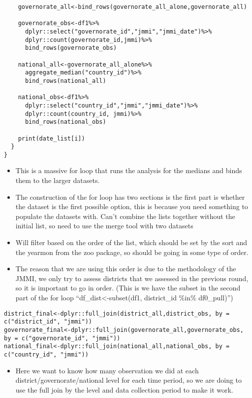 \documentclass[
]{article}
\providecommand{\tightlist}{%
  \setlength{\itemsep}{0pt}\setlength{\parskip}{0pt}}
\begin{document}
\begin{verbatim}
    governorate_all<-bind_rows(governorate_all_alone,governorate_all)
    
    governorate_obs<-df1%>%
      dplyr::select("governorate_id","jmmi","jmmi_date")%>%
      dplyr::count(governorate_id,jmmi)%>%
      bind_rows(governorate_obs)
    
    national_all<-governorate_all_alone%>%
      aggregate_median("country_id")%>%
      bind_rows(national_all)
    
    national_obs<-df1%>%
      dplyr::select("country_id","jmmi","jmmi_date")%>%
      dplyr::count(country_id, jmmi)%>%
      bind_rows(national_obs)
    
    print(date_list[i])
  }
}
\end{verbatim}

\begin{itemize}
\tightlist
\item
  This is a massive for loop that runs the analysis for the medians and
  binds them to the larger datasets.
\item
  The construction of the for loop has two sections is the first part is
  whether the dataset is the first possible option, this is because you
  need something to populate the datasets with. Can't combine the lists
  together without the initial list, so need to use the merge tool with
  two datasets
\item
  Will filter based on the order of the list, which should be set by the
  sort and the yearmon from the zoo package, so should be going in some
  type of order.
\item
  The reason that we are using this order is due to the methodology of
  the JMMI, we only try to assess districts that we assessed in the
  previous round, so it is important to go in order. (This is we have
  the subset in the second part of the for loop
  ``df\_dist\textless-subset(df1, district\_id \%in\% df0\_pull)'')
\end{itemize}

\begin{verbatim}
district_final<-dplyr::full_join(district_all,district_obs, by = c("district_id", "jmmi"))
governorate_final<-dplyr::full_join(governorate_all,governorate_obs, by = c("governorate_id", "jmmi"))
national_final<-dplyr::full_join(national_all,national_obs, by = c("country_id", "jmmi"))
\end{verbatim}

\begin{itemize}
\tightlist
\item
  Here we want to know how many observation we did at each
  district/governorate/national level for each time period, so we are
  doing to use the full join by the level and data collection period to
  make it work.
\end{itemize}
\end{document}
